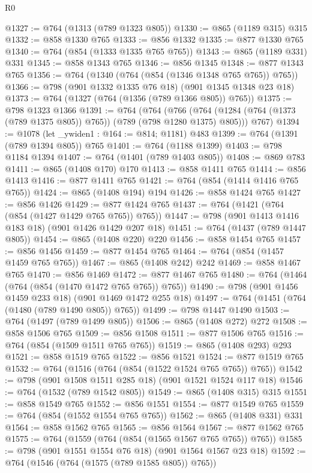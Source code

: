 \begin{lexlean}{R0}
\begin{coremodule}
{{{{{@1327 := @764 (@1313 (@789 @1323 @805))
@1330 := @865 (@1189 @315) @315
@1332 := @858 @1330 @765
@1333 := @856 @1332
@1335 := @877 @1330 @765
@1340 := @764 (@854 (@1333 @1335 @765 @765))
@1343 := @865 (@1189 @331) @331
@1345 := @858 @1343 @765
@1346 := @856 @1345
@1348 := @877 @1343 @765
@1356 := @764 (@1340 (@764 (@854 (@1346 @1348 @765 @765)) @765))
@1366 := @798 (@901 @1332 @1335 @76 @18) (@901 @1345 @1348 @23 @18)
@1373 := @764 (@1327 (@764 (@1356 (@789 @1366 @805)) @765))
@1375 := @798 @1323 @1366
@1391 := @764
    (@764
      (@766 (@764 (@1284 (@764 (@1373 (@789 @1375 @805)) @765)) (@789 (@798 @1280 @1375) @805)))
      @767)
@1394 := @1078 (let _ywiden1 : @164 := @814; @1181) @483
@1399 := @764 (@1391 (@789 @1394 @805)) @765
@1401 := @764 (@1188 @1399)
@1403 := @798 @1184 @1394
@1407 := @764 (@1401 (@789 @1403 @805))
@1408 := @869 @783
@1411 := @865 (@1408 @170) @170
@1413 := @858 @1411 @765
@1414 := @856 @1413
@1416 := @877 @1411 @765
@1421 := @764 (@854 (@1414 @1416 @765 @765))
@1424 := @865 (@1408 @194) @194
@1426 := @858 @1424 @765
@1427 := @856 @1426
@1429 := @877 @1424 @765
@1437 := @764 (@1421 (@764 (@854 (@1427 @1429 @765 @765)) @765))
@1447 := @798 (@901 @1413 @1416 @183 @18) (@901 @1426 @1429 @207 @18)
@1451 := @764 (@1437 (@789 @1447 @805))
@1454 := @865 (@1408 @220) @220
@1456 := @858 @1454 @765
@1457 := @856 @1456
@1459 := @877 @1454 @765
@1464 := @764 (@854 (@1457 @1459 @765 @765))
@1467 := @865 (@1408 @242) @242
@1469 := @858 @1467 @765
@1470 := @856 @1469
@1472 := @877 @1467 @765
@1480 := @764 (@1464 (@764 (@854 (@1470 @1472 @765 @765)) @765))
@1490 := @798 (@901 @1456 @1459 @233 @18) (@901 @1469 @1472 @255 @18)
@1497 := @764 (@1451 (@764 (@1480 (@789 @1490 @805)) @765))
@1499 := @798 @1447 @1490
@1503 := @764 (@1497 (@789 @1499 @805))
@1506 := @865 (@1408 @272) @272
@1508 := @858 @1506 @765
@1509 := @856 @1508
@1511 := @877 @1506 @765
@1516 := @764 (@854 (@1509 @1511 @765 @765))
@1519 := @865 (@1408 @293) @293
@1521 := @858 @1519 @765
@1522 := @856 @1521
@1524 := @877 @1519 @765
@1532 := @764 (@1516 (@764 (@854 (@1522 @1524 @765 @765)) @765))
@1542 := @798 (@901 @1508 @1511 @285 @18) (@901 @1521 @1524 @117 @18)
@1546 := @764 (@1532 (@789 @1542 @805))
@1549 := @865 (@1408 @315) @315
@1551 := @858 @1549 @765
@1552 := @856 @1551
@1554 := @877 @1549 @765
@1559 := @764 (@854 (@1552 @1554 @765 @765))
@1562 := @865 (@1408 @331) @331
@1564 := @858 @1562 @765
@1565 := @856 @1564
@1567 := @877 @1562 @765
@1575 := @764 (@1559 (@764 (@854 (@1565 @1567 @765 @765)) @765))
@1585 := @798 (@901 @1551 @1554 @76 @18) (@901 @1564 @1567 @23 @18)
@1592 := @764 (@1546 (@764 (@1575 (@789 @1585 @805)) @765))
}}}}}
\end{coremodule}
\end{lexlean}
